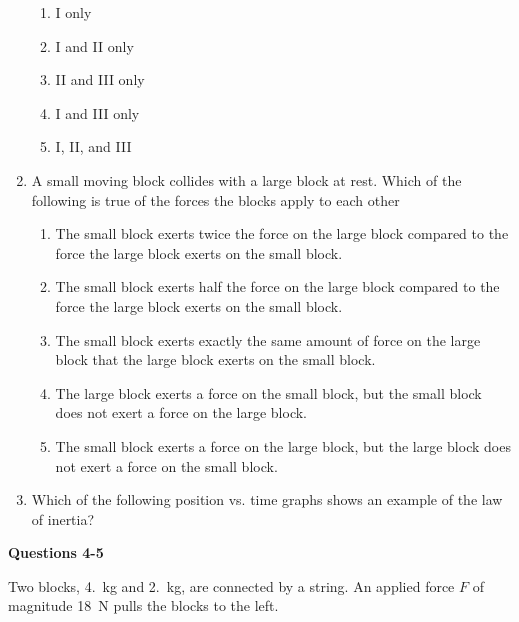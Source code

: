 \documentclass{../../oss-apphys}
\begin{document}
\begin{multicols}{2}
\begin{enumerate}[leftmargin=18pt]
    \begin{enumerate}[noitemsep,topsep=0pt,leftmargin=18pt,label=(\Alph*)]
    \item I only
    \item I and II only
    \item II and III only
    \item I and III only
    \item I, II, and III
    \end{enumerate}
    
  \item A small moving block collides with a large block at rest. Which of the
    following is true of the forces the blocks apply to each other
    \begin{enumerate}[noitemsep,topsep=0pt,leftmargin=18pt,label=(\Alph*)]
    \item The small block exerts twice the force on the large block
      compared to the force the large block exerts on the small block.
    \item The small block exerts half the force on the large block compared
      to the force the large block exerts on the small block.
    \item The small block exerts exactly the same amount of force on the
      large block that the large block exerts on the small block.
    \item The large block exerts a force on the small block, but the small
      block does not exert a force on the large block.
    \item The small block exerts a force on the large block, but the large
      block does not exert a force on the small block.
    \end{enumerate}
    \columnbreak
    
  \item Which of the following position vs. time graphs shows an example of
    the law of inertia?
  \end{enumerate}
  \columnbreak
  
  \textbf{Questions 4-5}

  Two blocks, \SI{4.}{\kilo\gram} and \SI{2.}{\kilo\gram}, are connected by a
  string. An applied force $F$ of magnitude \SI{18}{\newton} pulls the blocks
  to the left.
  \begin{center}
  \end{center}
  
  \begin{enumerate}[resume,leftmargin=18pt]
    

\end{enumerate}
\end{multicols}
\end{document}
